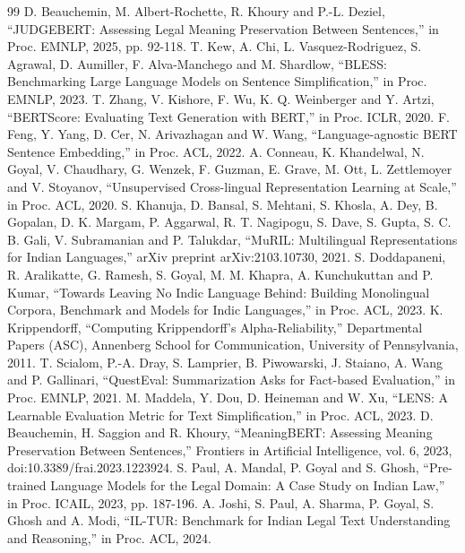 \documentclass[conference]{IEEEtran}
\begin{document}
\begin{thebibliography}{99}
 D. Beauchemin, M. Albert-Rochette, R. Khoury and P.-L. Deziel, “JUDGEBERT: Assessing Legal Meaning Preservation Between Sentences,” in Proc. EMNLP, 2025, pp. 92-118.
 T. Kew, A. Chi, L. Vasquez-Rodriguez, S. Agrawal, D. Aumiller, F. Alva-Manchego and M. Shardlow, “BLESS: Benchmarking Large Language Models on Sentence Simplification,” in Proc. EMNLP, 2023.
 T. Zhang, V. Kishore, F. Wu, K. Q. Weinberger and Y. Artzi, “BERTScore: Evaluating Text Generation with BERT,” in Proc. ICLR, 2020.
 F. Feng, Y. Yang, D. Cer, N. Arivazhagan and W. Wang, “Language-agnostic BERT Sentence Embedding,” in Proc. ACL, 2022.
 A. Conneau, K. Khandelwal, N. Goyal, V. Chaudhary, G. Wenzek, F. Guzman, E. Grave, M. Ott, L. Zettlemoyer and V. Stoyanov, “Unsupervised Cross-lingual Representation Learning at Scale,” in Proc. ACL, 2020.
 S. Khanuja, D. Bansal, S. Mehtani, S. Khosla, A. Dey, B. Gopalan, D. K. Margam, P. Aggarwal, R. T. Nagipogu, S. Dave, S. Gupta, S. C. B. Gali, V. Subramanian and P. Talukdar, “MuRIL: Multilingual Representations for Indian Languages,” arXiv preprint arXiv:2103.10730, 2021.
 S. Doddapaneni, R. Aralikatte, G. Ramesh, S. Goyal, M. M. Khapra, A. Kunchukuttan and P. Kumar, “Towards Leaving No Indic Language Behind: Building Monolingual Corpora, Benchmark and Models for Indic Languages,” in Proc. ACL, 2023.
 K. Krippendorff, “Computing Krippendorff's Alpha-Reliability,” Departmental Papers (ASC), Annenberg School for Communication, University of Pennsylvania, 2011.
 T. Scialom, P.-A. Dray, S. Lamprier, B. Piwowarski, J. Staiano, A. Wang and P. Gallinari, “QuestEval: Summarization Asks for Fact-based Evaluation,” in Proc. EMNLP, 2021.
 M. Maddela, Y. Dou, D. Heineman and W. Xu, “LENS: A Learnable Evaluation Metric for Text Simplification,” in Proc. ACL, 2023.
 D. Beauchemin, H. Saggion and R. Khoury, “MeaningBERT: Assessing Meaning Preservation Between Sentences,” Frontiers in Artificial Intelligence, vol. 6, 2023, doi:10.3389/frai.2023.1223924.
 S. Paul, A. Mandal, P. Goyal and S. Ghosh, “Pre-trained Language Models for the Legal Domain: A Case Study on Indian Law,” in Proc. ICAIL, 2023, pp. 187-196.
 A. Joshi, S. Paul, A. Sharma, P. Goyal, S. Ghosh and A. Modi, “IL-TUR: Benchmark for Indian Legal Text Understanding and Reasoning,” in Proc. ACL, 2024.
\end{thebibliography}
\end{document}
